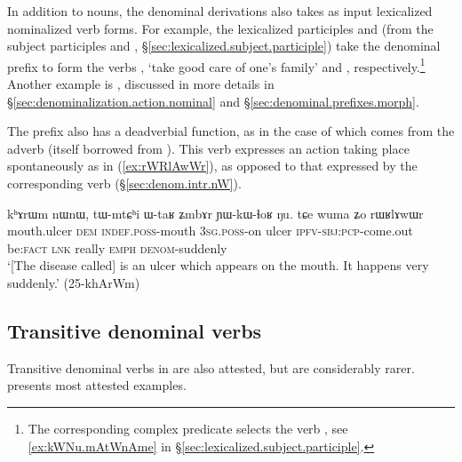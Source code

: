  
In addition to nouns, the  denominal derivations also takes as input lexicalized nominalized verb forms. For example, the lexicalized participles   and   (from the subject participles   and  , §\ref{sec:lexicalized.subject.participle}) take the  denominal prefix to form the verbs  , `take good care of one's family' and , respectively.\footnote{The corresponding complex predicate selects the verb , see \ref{ex:kWNu.mAtWnAme} in §\ref{sec:lexicalized.subject.participle}.} Another example is , discussed in more details in §\ref{sec:denominalization.action.nominal} and §\ref{sec:denominal.prefixes.morph}.
 
The  prefix also has a deadverbial function, as in the case of   which comes from the adverb  (itself borrowed from ). This verb expresses an action taking place spontaneously as in (\ref{ex:rWRlAwWr}), as opposed to that expressed by the corresponding  verb  (§\ref{sec:denom.intr.nW}).

\begin{exe}
\ex \label{ex:rWRlAwWr}
 \gll kʰɤrɯm nɯnɯ, tɯ-mtɕʰi ɯ-taʁ ʑmbɤr ɲɯ-kɯ-ɬoʁ ŋu. tɕe wuma ʑo rɯʁlɤwɯr    \\
mouth.ulcer \textsc{dem} \textsc{indef}.\textsc{poss}-mouth \textsc{3sg}.\textsc{poss}-on ulcer \textsc{ipfv}-\textsc{sbj}:\textsc{pcp}-come.out be:\textsc{fact} \textsc{lnk} really \textsc{emph} \textsc{denom}-suddenly  \\
\glt `[The disease called]  is an ulcer which appears on the mouth. It happens very suddenly.' (25-khArWm) 
\end{exe}

\subsection{Transitive  denominal verbs}   \label{sec:denom.tr.rA}
Transitive denominal verbs in  are also attested, but are considerably rarer.  presents most attested examples.


